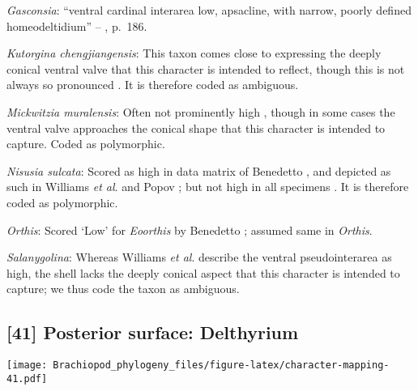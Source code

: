 \documentclass[openany]{book}
\theoremstyle{definition}
\theoremstyle{definition}
\theoremstyle{definition}
\theoremstyle{remark}
\begin{document}
\hypertarget{Gasconsia-coding-40}{}
\emph{Gasconsia}: ``ventral cardinal interarea low, apsacline, with
narrow, poorly defined homeodeltidium'' --
\citet{Williams2000LinguliformeaCraniiformea}, p.~186.

\hypertarget{Kutorgina_chengjiangensis-coding-40}{}
\emph{Kutorgina chengjiangensis}: This taxon
\citetext{\citealp[see][fig.
129]{Williams2000LinguliformeaCraniiformea}; \citealp[fig.
1]{Popov1992TheCambrian}} comes close to expressing the deeply conical
ventral valve that this character is intended to reflect, though this is
not always so pronounced \citep[e.g.][fig.
125]{Williams2000LinguliformeaCraniiformea}. It is therefore coded as
ambiguous.

\hypertarget{Mickwitzia_muralensis-coding-40}{}
\emph{Mickwitzia muralensis}: Often not prominently high
\citep{Skovsted2003EarlyCambrian, Balthasar2004Shellstructure}, though
in some cases \citep[e.g.][]{Butler2015Exceptionallypreserved} the
ventral valve approaches the conical shape that this character is
intended to capture. Coded as polymorphic.

\hypertarget{Nisusia_sulcata-coding-40}{}
\emph{Nisusia sulcata}: Scored as high in data matrix of Benedetto
\citeyearpar{Benedetto2009iChaniella}, and depicted as such in Williams
\emph{et al}. \citeyearpar[fig.
125]{Williams2000LinguliformeaCraniiformea} and Popov \citeyearpar[fig.
1]{Popov1992TheCambrian}; but not high in all specimens
\citep[e.g.][fig. 126]{Williams2000LinguliformeaCraniiformea}. It is
therefore coded as polymorphic.

\hypertarget{Orthis-coding-40}{}
\emph{Orthis}: Scored `Low' for \emph{Eoorthis} by Benedetto
\citeyearpar{Benedetto2009iChaniella}; assumed same in \emph{Orthis}.

\hypertarget{Salanygolina-coding-40}{}
\emph{Salanygolina}: Whereas Williams \emph{et al}.
\citeyearpar[p.~156]{Williams2000LinguliformeaCraniiformea} describe the
ventral pseudointerarea as high, the shell lacks the deeply conical
aspect that this character is intended to capture; we thus code the
taxon as ambiguous.

\subsection*{{[}41{]} Posterior surface:
Delthyrium}\label{posterior-surface-delthyrium}

\texttt{[image: Brachiopod\_phylogeny\_files/figure-latex/character-mapping-41.pdf]}
\end{document}
